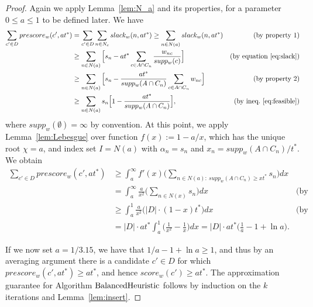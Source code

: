 \begin{proof}
Again we apply Lemma~\ref{lem:N_a} and its properties, for a parameter $0\leq a\leq 1$ to be defined later. We have
\begin{align*}
    \sum_{c'\in D} prescore_w(c',at^*) &= \sum_{c'\in D} \sum_{n\in N_c} slack_w(n, at^*) 
    \geq \sum_{n\in N(a)} slack_w(n, at^*) & \text{(by property 1)}\\
    &\geq \sum_{n\in N(a)} \Big[ s_n - at^* \sum_{c\in A\cap C_n} \frac{w_{nc}}{supp_w(c)} \Big] &\text{(by equation \ref{eq:slack})}\\
    &\geq \sum_{n\in N(a)} \Big[ s_n - \frac{at^*}{supp_w(A\cap C_n)} \sum_{c\in A\cap C_n} w_{nc} \Big] &\text{(by property 2)}\\
    &\geq \sum_{n\in N(a)} s_n\Big[ 1- \frac{at^*}{supp_w(A\cap C_n)} \Big], &\text{(by ineq.~\ref{eq:feasible})}
\end{align*}
%
where $supp_w(\emptyset)=\infty$ by convention. 
At this point, we apply Lemma~\ref{lem:Lebesgue} over function $f(x):=1-a/x$, which has the unique root $\chi=a$, and index set $I=N(a)$ with $\alpha_n=s_n$ and $x_n=supp_w(A\cap C_n)/t^*$. We obtain
\begin{align*}
    \sum_{c'\in D} prescore_w(c',at^*) &\geq \int_{a}^{\infty} f'(x) \Big( \sum_{n\in N(a): \ supp_w(A\cap C_n)\geq xt^*} s_n \Big)dx\\
    &=\int_{a}^{\infty} \frac{a}{x^2}\Big( \sum_{n\in N(x)} s_n \Big)dx & \text{(by property 4)}\\
    &\geq \int_{a}^1 \frac{a}{x^2} \Big( |D|\cdot (1-x)t^* \Big)dx & \text{(by property 3)}\\
    & = |D|\cdot at^* \int_{a}^1 \Big( \frac{1}{x^2} - \frac{1}{x} \Big)dx = |D|\cdot at^*\Big(\frac{1}{a} - 1 + \ln  a\Big).
\end{align*}

If we now set $a=1/3.15$, we have that $1/a - 1 + \ln a\geq 1$, and thus by an averaging argument there is a candidate $c'\in D$ for which $prescore_w(c',at^*)\geq at^*$, and hence $score_w(c')\geq at^*$. The approximation guarantee for Algorithm $\operatorname{BalancedHeuristic}$ follows by induction on the $k$ iterations and Lemma~\ref{lem:insert}.
\end{proof}
